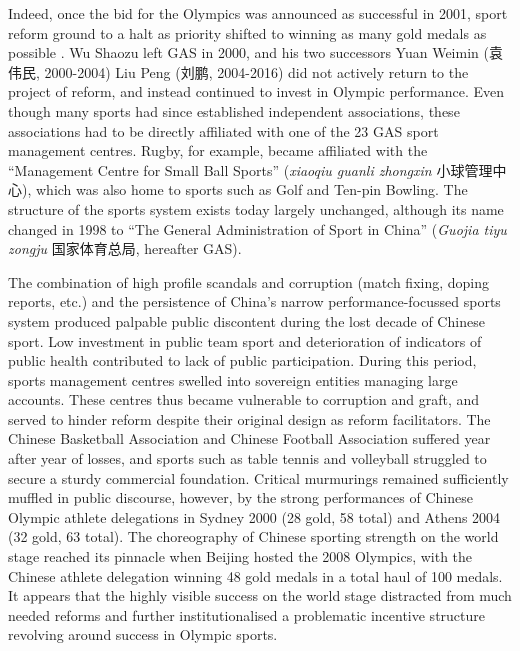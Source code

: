 \begin{CJK}{UTF8}{gbsn}
Indeed, once the bid for the Olympics was announced as successful in 2001, sport reform ground to a halt as priority shifted to winning as many gold medals as possible \citep{News2017}.  Wu Shaozu left GAS in 2000, and his two successors Yuan Weimin (袁伟民, 2000-2004) Liu Peng (刘鹏, 2004-2016) did not actively return to the project of reform, and instead continued to invest in Olympic performance.  Even though many sports had since established independent associations, these associations had to be directly affiliated with one of the 23 GAS sport management centres. Rugby, for example, became affiliated with the ``Management Centre for Small Ball Sports'' (\textit{xiaoqiu guanli zhongxin} 小球管理中心), which was also home to sports such as Golf and Ten-pin Bowling.  The structure of the sports system exists today largely unchanged, although its name changed in 1998 to ``The General Administration of Sport in China'' (\textit{Guojia tiyu zongju} 国家体育总局, hereafter GAS).

The combination of high profile scandals and corruption (match fixing, doping reports, etc.) and the persistence of China's narrow performance-focussed sports system produced palpable public discontent during the lost decade of Chinese sport.  Low investment in public team sport and deterioration of indicators of public health contributed to lack of public participation.  During this period, sports management centres swelled into sovereign entities managing large accounts. These centres thus became vulnerable to corruption and graft, and served to hinder reform despite their original design as reform facilitators.  The Chinese Basketball Association and Chinese Football Association suffered year after year of losses, and sports such as table tennis and volleyball struggled to secure a sturdy commercial foundation.  Critical murmurings remained sufficiently muffled in public discourse, however, by the strong performances of Chinese Olympic athlete delegations in Sydney 2000 (28 gold, 58 total) and Athens 2004 (32 gold, 63 total). The choreography of Chinese sporting strength on the world stage reached its pinnacle when Beijing hosted the 2008 Olympics, with the Chinese athlete delegation winning 48 gold medals in a total haul of 100 medals.  It appears that the highly visible success on the world stage distracted from much needed reforms and further institutionalised a problematic incentive structure revolving around success in Olympic sports.





\end{CJK}
